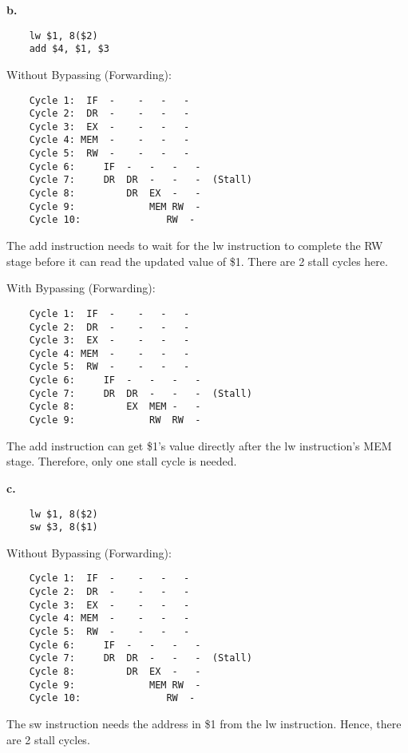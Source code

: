 \documentclass{article}
\begin{document}
\textbf{b.}

\begin{verbatim}
    lw $1, 8($2)
    add $4, $1, $3
\end{verbatim}

Without Bypassing (Forwarding):

\begin{verbatim}
    Cycle 1:  IF  -    -   -   -  
    Cycle 2:  DR  -    -   -   -  
    Cycle 3:  EX  -    -   -   -  
    Cycle 4: MEM  -    -   -   -  
    Cycle 5:  RW  -    -   -   -  
    Cycle 6:     IF  -   -   -   -  
    Cycle 7:     DR  DR  -   -   -  (Stall)
    Cycle 8:         DR  EX  -   -  
    Cycle 9:             MEM RW  -  
    Cycle 10:               RW  -  
\end{verbatim}

The add instruction needs to wait for the lw instruction to
complete the RW stage before it can read the updated value of \$1.
There are 2 stall cycles here.

With Bypassing (Forwarding):

\begin{verbatim}
    Cycle 1:  IF  -    -   -   -  
    Cycle 2:  DR  -    -   -   -  
    Cycle 3:  EX  -    -   -   -  
    Cycle 4: MEM  -    -   -   -  
    Cycle 5:  RW  -    -   -   -  
    Cycle 6:     IF  -   -   -   -  
    Cycle 7:     DR  DR  -   -   -  (Stall)
    Cycle 8:         EX  MEM -   -  
    Cycle 9:             RW  RW  -  
\end{verbatim}

The add instruction can get \$1's value directly after the lw
instruction's MEM stage. Therefore, only one stall cycle is needed.

\textbf{c.}

\begin{verbatim}
    lw $1, 8($2)
    sw $3, 8($1)
\end{verbatim}

Without Bypassing (Forwarding):

\begin{verbatim}
    Cycle 1:  IF  -    -   -   -  
    Cycle 2:  DR  -    -   -   -  
    Cycle 3:  EX  -    -   -   -  
    Cycle 4: MEM  -    -   -   -  
    Cycle 5:  RW  -    -   -   -  
    Cycle 6:     IF  -   -   -   -  
    Cycle 7:     DR  DR  -   -   -  (Stall)
    Cycle 8:         DR  EX  -   -  
    Cycle 9:             MEM RW  -  
    Cycle 10:               RW  -  
\end{verbatim}

The sw instruction needs the address in \$1 from the
lw instruction. Hence, there are 2 stall cycles.
\end{document}
